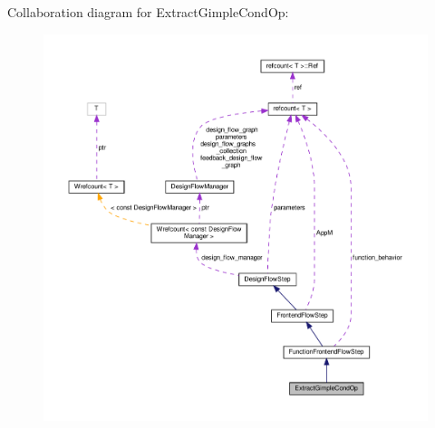 Collaboration diagram for Extract\+Gimple\+Cond\+Op\+:
\nopagebreak
\begin{figure}[H]
\begin{center}
\leavevmode
\includegraphics[width=350pt]{d8/d82/classExtractGimpleCondOp__coll__graph}
\end{center}
\end{figure}
